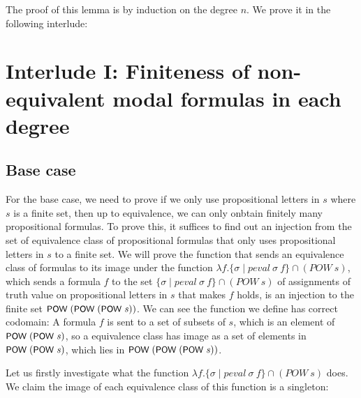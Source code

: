 \documentclass[letterpaper]{article}
\renewcommand{\HOLConst}[1]{{\textsf{\upshape\small #1}}}
\renewcommand{\HOLinline}[1]{\ensuremath{#1}}
\begin{document}
The proof of this lemma is by induction on the degree $n$. We prove it in the following interlude:

\section{Interlude I: Finiteness of non-equivalent modal formulas in each degree}

\subsection{Base case}
For the base case, we need to prove if we only use propositional letters in $s$ where $s$ is a finite set, then up to equivalence, we can only onbtain finitely many propositional formulas. To prove this, it suffices to find out an injection from the set of equivalence class of propositional formulas that only uses propositional letters in $s$ to a finite set. We will prove the function that sends an equivalence class of formulas to its image under the function $\lambda f. \{\sigma \mid peval\ \sigma\ f\} \cap (POW \ s)$, which sends a formula $f$ to the set $\{\sigma \mid peval\ \sigma\ f\} \cap (POW \ s)$ of assignments of truth value on propositional letters in $s$ that makes $f$ holds, is an injection to the finite set \HOLinline{\HOLConst{POW}\;(\HOLConst{POW}\;(\HOLConst{POW}\;\HOLFreeVar{s}))}. We can see the function we define has correct codomain: A formula $f$ is sent to a set of subsets of $s$, which is an element of \HOLinline{\HOLConst{POW}\;(\HOLConst{POW}\;\HOLFreeVar{s})}, so a equivalence class has image as a set of elements in \HOLinline{\HOLConst{POW}\;(\HOLConst{POW}\;\HOLFreeVar{s})}, which lies in \HOLinline{\HOLConst{POW}\;(\HOLConst{POW}\;(\HOLConst{POW}\;\HOLFreeVar{s}))}.

Let us firstly investigate what the function $\lambda f. \{\sigma \mid peval\ \sigma\ f\} \cap (POW \ s)$ does. We claim the image of each equivalence class of this function is a singleton:
\end{document}
